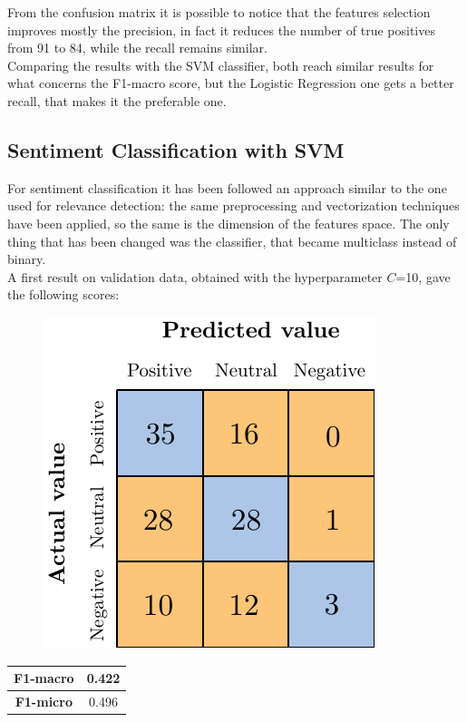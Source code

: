 From the confusion matrix it is possible to notice that the features selection improves mostly the precision, in fact it reduces the number of true positives from 91 to 84, while the recall remains similar.\\
Comparing the results with the SVM classifier, both reach similar results for what concerns the F1-macro score, but the Logistic Regression one gets a better recall, that makes it the preferable one.



\subsection{Sentiment Classification with SVM}

For sentiment classification it has been followed an approach similar to the one used for relevance detection: the same preprocessing and vectorization techniques have been applied, so the same is the dimension of the features space. The only thing that has been changed was the classifier, that became multiclass instead of binary. \\
A first result on validation data, obtained with the hyperparameter $C$=10, gave the following scores:

\begin{figure}[H]
	\centering
	\includegraphics[scale=1]{figures/conf_matrices/ita_snt_svm/ita_snt_svm_bfs.pdf}
	\label{fig:ita_snt_svm_bfs}
\end{figure}

\begin{center}
	\begin{tabular}{ | c | c | } 
		\hline
		\textbf{F1-macro} & 0.422 \\
		\hline
		\textbf{F1-micro} & 0.496 \\ 
		\hline
	\end{tabular}
\end{center}

